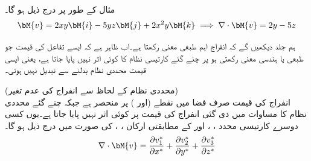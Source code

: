 مثال کے طور پر  درج ذیل ہو گا۔
\begin{align*}
\bM{v}=2xy\bM{i}-5yz\bM{j}+2x^2y\bM{k}\implies \nabla \cdot \bM{v}=2y-5z
\end{align*}

ہم جلد دیکھیں گے کہ انفراج اہم طبعی معنی  رکھتا ہے۔اب ظاہر ہے کہ ایسے تفاعل کی قیمت جو طبعی یا ہندسی معنی رکھتی ہو پر چنے گئے کارتیسی نظام کا کوئی اثر نہیں پایا جاتا ہے، یعنی ایسی قیمت محددی نظام بدلنے سے تبدیل نہیں ہوتی۔ 

\quad (محددی نظام کے لحاظ سے انفراج کی عدم تغیر) \\
انفراج  کی قیمت صرف فضا میں نقطے  (اور ) پر منحصر ہے جبکہ چنے گئے محددی نظام کا مساوات  میں دی گئی انفراج کی قیمت پر کوئی اثر نہیں پایا جاتا ہے۔یوں کسی دوسرے کارتیسی محدد ، ،  اور  کے مطابقتی ارکان ، ،  کی صورت میں  درج ذیل ہو گا۔
\begin{align}\label{مساوات_الاحصاء_پھیلاو_تعریف_ب}
\nabla \cdot \bM{v}=\frac{\partial v_1^*}{\partial x^*}+\frac{\partial v_2^*}{\partial y^*}+\frac{\partial v_3^*}{\partial z^*}
\end{align}

